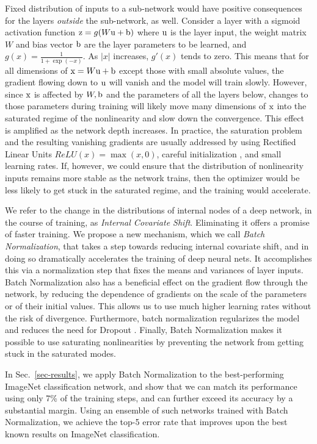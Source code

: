 \documentclass[twocolumn]{article}
\begin{document}
Fixed distribution of inputs to a sub-network would have positive
consequences for the layers {\em outside} the sub-network, as
well. Consider a layer with a sigmoid activation function $\mathrm{z} =
g(W\mathrm{u}+\mathrm{b})$ where $\mathrm{u}$ is the layer input, the weight matrix $W$ and
bias vector $\mathrm{b}$ are the layer parameters to be learned, and $g(x) =
\frac{1}{1+\exp(-x)}$. As $|x|$ increases, $g'(x)$ tends to zero. This
means that for all dimensions of $\mathrm{x}=W\mathrm{u}+\mathrm{b}$ except those with
small absolute values, the gradient flowing down to $\mathrm{u}$ will vanish
and the model will train slowly. However, since $\mathrm{x}$ is affected by
$W, \mathrm{b}$ and the parameters of all the layers below, changes to those
parameters during training will likely move many dimensions of $\mathrm{x}$
into the saturated regime of the nonlinearity and slow down the
convergence. This effect is amplified as the network depth
increases. In practice, the saturation problem and the resulting
vanishing gradients are usually addressed by using Rectified Linear
Units \cite{relu} $ReLU(x)=\max(x,0)$, careful initialization
\cite{glorot-difficulty,iclr-dynamics}, and small learning rates.  If,
however, we could ensure that the distribution of nonlinearity inputs
remains more stable as the network trains, then the optimizer would be
less likely to get stuck in the saturated regime, and the training
would accelerate.

We refer to the change in the distributions of internal nodes of a
deep network, in the course of training, as {\em Internal Covariate Shift}. Eliminating it offers
a promise of faster training.  We propose a new mechanism, which we
call {\em Batch Normalization}, that takes a step towards reducing
internal covariate shift, and in doing so dramatically accelerates the
training of deep neural nets. It accomplishes this via a normalization
step that fixes the means and variances of layer inputs. Batch
Normalization also has a beneficial effect on the gradient flow
through the network, by reducing the dependence of gradients on the
scale of the parameters or of their initial values. This allows us to
use much higher learning rates without the risk of
divergence. Furthermore, batch normalization regularizes the model and
reduces the need for Dropout \cite{dropout}.  Finally, Batch
Normalization makes it possible to use saturating nonlinearities by
preventing the network from getting stuck in the saturated modes.

In Sec.~\ref{sec-results}, we apply Batch Normalization to the
best-performing ImageNet classification network, and show that we can
match its performance using only 7\% of the training steps, and can
further exceed its accuracy by a substantial margin.  Using an
ensemble of such networks trained with Batch Normalization, we achieve
the top-5 error rate that improves upon the best known results on
ImageNet classification.
\end{document}
